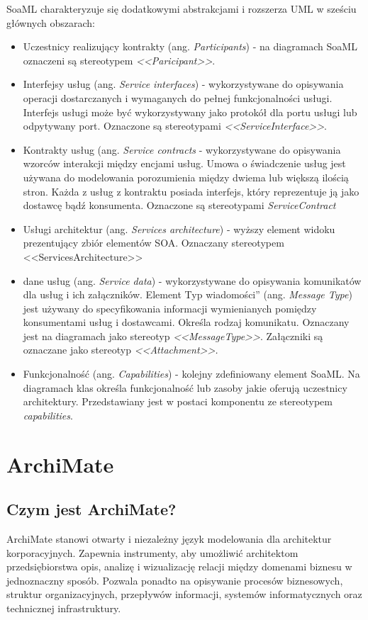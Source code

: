 SoaML charakteryzuje się dodatkowymi abstrakcjami\cite{PlatIntGor} i rozszerza UML w sześciu głównych obszarach: 
\begin{itemize}
\item{Uczestnicy realizujący kontrakty (ang. \emph{Participants}) - na diagramach SoaML oznaczeni są stereotypem \emph{<<Paricipant>>}.}
\item{Interfejsy usług (ang. \emph{Service interfaces}) - wykorzystywane do opisywania operacji dostarczanych i wymaganych do pełnej funkcjonalności usługi. Interfejs usługi może być wykorzystywany jako protokół dla portu usługi lub odpytywany port. Oznaczone są stereotypami \emph{<<ServiceInterface>>}.}
\item{Kontrakty usług (ang. \emph{Service contracts} - wykorzystywane do opisywania wzorców interakcji między encjami usług. Umowa o świadczenie usług jest używana do modelowania porozumienia między dwiema lub większą ilością stron. Każda z usług z kontraktu posiada interfejs, który reprezentuje ją jako dostawcę bądź konsumenta. Oznaczone są stereotypami \emph{ServiceContract}}
\item{Usługi architektur (ang. \emph{Services architecture}) - wyższy element widoku prezentujący zbiór elementów SOA. Oznaczany stereotypem <<ServicesArchitecture>>}
\item{dane usług (ang. \emph{Service data}) - wykorzystywane do opisywania komunikatów dla usług i ich załączników. Element \quotedblbase Typ wiadomości\textquotedblright} (ang. \emph{Message Type}) jest używany do specyfikowania informacji wymienianych pomiędzy konsumentami usług i dostawcami. Określa rodzaj komunikatu. Oznaczany jest na diagramach jako stereotyp \emph{<<MessageType>>}. Załączniki są oznaczane jako stereotyp \emph{<<Attachment>>.}
\item{Funkcjonalność (ang. \emph{Capabilities}) - kolejny zdefiniowany element SoaML. Na diagramach klas określa funkcjonalność lub zasoby jakie oferują uczestnicy architektury. Przedstawiany jest w postaci komponentu ze stereotypem \emph{capabilities}.\cite{SoaMLErvBase}}
\end{itemize} 

\section{ArchiMate}

\subsection{Czym jest ArchiMate?}
ArchiMate stanowi otwarty i niezależny język modelowania dla architektur korporacyjnych. Zapewnia instrumenty, aby umożliwić architektom przedsiębiorstwa opis, analizę i wizualizację relacji między domenami biznesu w jednoznaczny sposób. Pozwala ponadto na opisywanie procesów biznesowych, struktur organizacyjnych, przepływów informacji, systemów informatycznych oraz technicznej infrastruktury.

